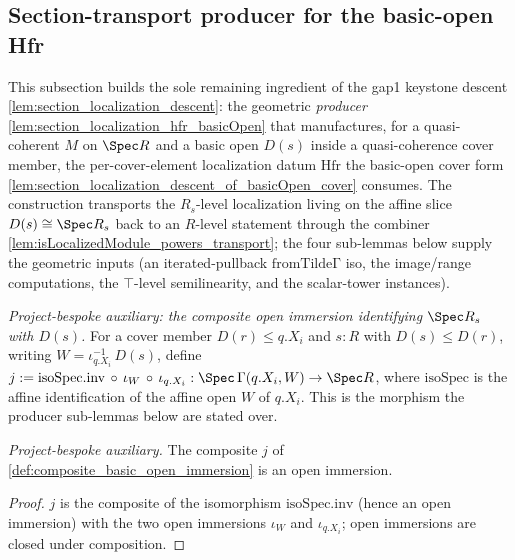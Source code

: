 \subsection{Section-transport producer for the basic-open Hfr}

This subsection builds the sole remaining ingredient of the gap1 keystone descent
\cref{lem:section_localization_descent}: the geometric \emph{producer}
\cref{lem:section_localization_hfr_basicOpen} that manufactures, for a quasi-coherent \(M\) on
\(\Spec R\) and a basic open \(D(s)\) inside a quasi-coherence cover member, the per-cover-element
localization datum \(\mathrm{Hfr}\) the basic-open cover form
\cref{lem:section_localization_descent_of_basicOpen_cover} consumes. The construction transports the
\(R_s\)-level localization living on the affine slice \(D(s) \cong \Spec R_s\) back to an
\(R\)-level statement through the combiner \cref{lem:isLocalizedModule_powers_transport}; the four
sub-lemmas below supply the geometric inputs (an iterated-pullback \(\mathrm{fromTildeΓ}\) iso, the
image/range computations, the \(\top\)-level semilinearity, and the scalar-tower instances).

\begin{definition}
  \label{def:composite_basic_open_immersion}
  \textit{Project-bespoke auxiliary: the composite open immersion identifying \(\Spec R_s\) with \(D(s)\).}
  For a cover member \(D(r) \le q.X_i\) and \(s : R\) with \(D(s) \le D(r)\), writing
  \(W = \iota_{q.X_i}^{-1}\,D(s)\), define
  \(j := \mathrm{isoSpec}.\mathrm{inv} \,\circ\, \iota_W \,\circ\, \iota_{q.X_i} :
  \Spec\,\Gamma(q.X_i, W) \to \Spec R\), where \(\mathrm{isoSpec}\) is the affine identification of the
  affine open \(W\) of \(q.X_i\). This is the morphism the producer sub-lemmas below are stated over.
\end{definition}

\begin{lemma}
  \label{lem:composite_basic_open_immersion_isOpenImmersion}
  \textit{Project-bespoke auxiliary.}
  The composite \(j\) of \cref{def:composite_basic_open_immersion} is an open immersion.
\end{lemma}
\begin{proof}
  \(j\) is the composite of the isomorphism \(\mathrm{isoSpec}.\mathrm{inv}\) (hence an open immersion) with
  the two open immersions \(\iota_W\) and \(\iota_{q.X_i}\); open immersions are closed under composition.
\end{proof}

